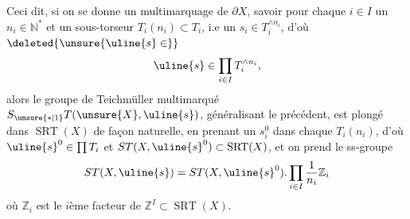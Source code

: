 
Ceci dit, si on se donne un
multimarquage de $\partial X$, savoir pour
chaque $i\in I$ un $n_i\in\mathbb N^*$ et un
sous-torseur
$T_i(n_i)\subset T_i$,
 i.e
un $s_i\in T_i^{\wedge n_i}$, d'où
$\deleted{\unsure{\uline{s}\in}}$
\[
\uline{s}\in\prod_{i\in I}T_i^{\wedge n_i},
\]
alors le groupe de Teichmüller multimarqué
$S_{\unsure{*|1}}T(\unsure{X},\uline{s})$,
généralisant le précédent, est
plongé dans $\operatorname{SRT}(X)$ de façon naturelle,
en prenant un $s_i^0$ dans chaque $T_i(n_i)$, d'où
$\uline{s}^0\in\prod T_i$ et
$ST(X,\uline{s}^0)\subset\operatorname{SRT}(X)$,
et on prend le ss-groupe
\[
ST(X,\uline{s})=ST(X,\uline{s}^0).
\prod_{i\in I}\frac1{n_i}\mathbb Z_i
\]
où $\mathbb Z_i$ est le $i$ème facteur de
$\mathbb Z^I\subset\operatorname{SRT}(X)$.


